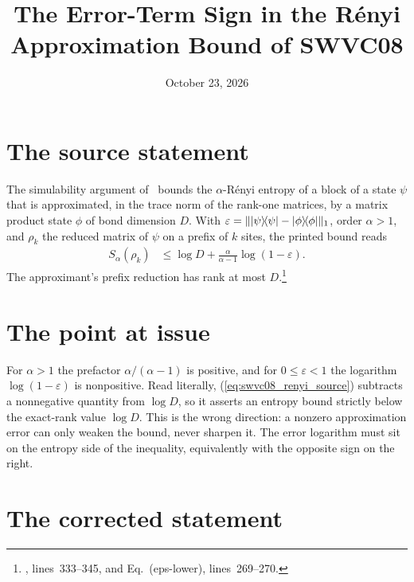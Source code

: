 \documentclass{article}
\title{The Error-Term Sign in the R\'enyi Approximation Bound of SWVC08}
\author{}
\date{October 23, 2026}
\begin{document}
\maketitle
{}

\section{The source statement}

The simulability argument of~\cite{Schuch2008EntropyScaling} bounds the
$\alpha$-R\'enyi entropy of a block of a state $\psi$ that is approximated, in
the trace norm of the rank-one matrices, by a matrix product state $\phi$ of
bond dimension $D$. With $\varepsilon=\lVert|\psi\rangle\!\langle \psi|-|\phi\rangle\!\langle \phi|\rVert_1$,
order $\alpha>1$, and $\rho_k$ the reduced matrix of $\psi$ on a prefix of $k$
sites, the printed bound reads
\begin{align}
    S_\alpha(\rho_k)
      &\le\log D+\frac{\alpha}{\alpha-1}\log(1-\varepsilon).
    \label{eq:swvc08_renyi_source}
\end{align}
The approximant's prefix reduction has rank at most
$D$.\footnote{, lines~333--345, and Eq.~(eps-lower),
    lines~269--270.}

\section{The point at issue}

For $\alpha>1$ the prefactor $\alpha/(\alpha-1)$ is positive, and for
$0\le\varepsilon<1$ the logarithm $\log(1-\varepsilon)$ is nonpositive.
Read literally, (\ref{eq:swvc08_renyi_source}) subtracts a nonnegative
quantity from $\log D$, so it asserts an entropy bound strictly below the
exact-rank value $\log D$. This is the wrong direction: a nonzero
approximation error can only weaken the bound, never sharpen it. The error
logarithm must sit on the entropy side of the inequality, equivalently with
the opposite sign on the right.

\section{The corrected statement}
\end{document}
